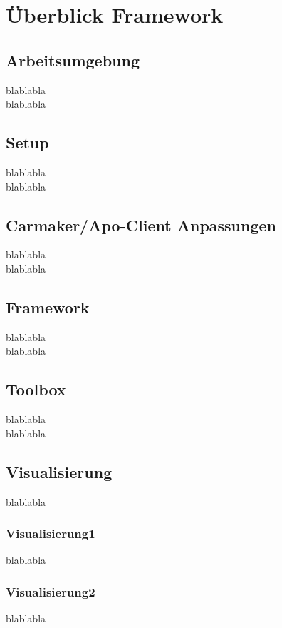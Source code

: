 
\chapter{Überblick Framework} %
\label{cha:Ueberblick_Framework}


\section{Arbeitsumgebung} %
\label{sub:Arbeitsumgebung}
blablabla\\

blablabla


\section{Setup} %
\label{sub:Setup}
blablabla\\

blablabla


\section{Carmaker/Apo-Client Anpassungen} %
\label{sub:Carmaker_Apo_Client_Anpassungen}
blablabla\\

blablabla


\section{Framework} %
\label{sub:Framework}
blablabla\\

blablabla


\section{Toolbox} %
\label{sub:Toolbox}
blablabla\\

blablabla


\section{Visualisierung} %
\label{sec:Visualisierung}
blablabla

\subsection{Visualisierung1} %
\label{sub:Visualisierung1}
blablabla


\subsection{Visualisierung2} %
\label{sub:Visualisierung2}
blablabla



